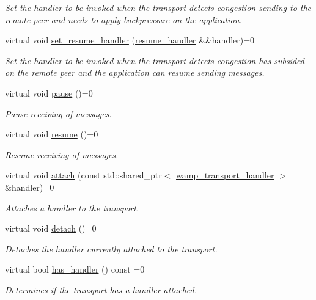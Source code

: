 \begin{DoxyCompactItemize}
\begin{DoxyCompactList}\small\item\em Set the handler to be invoked when the transport detects congestion sending to the remote peer and needs to apply backpressure on the application. \end{DoxyCompactList}\item 
virtual void \hyperlink{classautobahn_1_1wamp__transport_a96ed112feb74285454180113211ce8af}{set\+\_\+resume\+\_\+handler} (\hyperlink{classautobahn_1_1wamp__transport_ad36057ec27420793db7d8d658f3f003c}{resume\+\_\+handler} \&\&handler)=0
\begin{DoxyCompactList}\small\item\em Set the handler to be invoked when the transport detects congestion has subsided on the remote peer and the application can resume sending messages. \end{DoxyCompactList}\item 
virtual void \hyperlink{classautobahn_1_1wamp__transport_a2cf54e8ebcd39dd9cb5a6bc524d622bf}{pause} ()=0
\begin{DoxyCompactList}\small\item\em Pause receiving of messages. \end{DoxyCompactList}\item 
virtual void \hyperlink{classautobahn_1_1wamp__transport_a9af89639ddb25fc7c3922e01193afb40}{resume} ()=0
\begin{DoxyCompactList}\small\item\em Resume receiving of messages. \end{DoxyCompactList}\item 
virtual void \hyperlink{classautobahn_1_1wamp__transport_aa66d4c464c03837ca2fb293001882b96}{attach} (const std\+::shared\+\_\+ptr$<$ \hyperlink{classautobahn_1_1wamp__transport__handler}{wamp\+\_\+transport\+\_\+handler} $>$ \&handler)=0
\begin{DoxyCompactList}\small\item\em Attaches a handler to the transport. \end{DoxyCompactList}\item 
virtual void \hyperlink{classautobahn_1_1wamp__transport_a69fc40bd16dfa8d519375a29c3b4276e}{detach} ()=0\hypertarget{classautobahn_1_1wamp__transport_a69fc40bd16dfa8d519375a29c3b4276e}{}\label{classautobahn_1_1wamp__transport_a69fc40bd16dfa8d519375a29c3b4276e}

\begin{DoxyCompactList}\small\item\em Detaches the handler currently attached to the transport. \end{DoxyCompactList}\item 
virtual bool \hyperlink{classautobahn_1_1wamp__transport_acb9dd60d96ec4197823bc522f91cdee8}{has\+\_\+handler} () const =0
\begin{DoxyCompactList}\small\item\em Determines if the transport has a handler attached. \end{DoxyCompactList}\end{DoxyCompactItemize}


